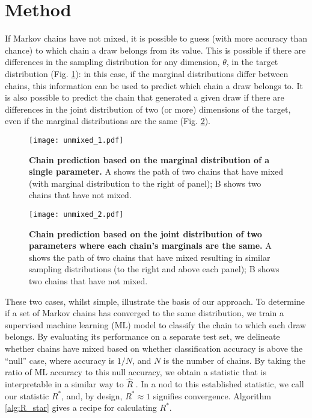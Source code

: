 \documentclass{article}
\begin{document}
\section{Method}\label{sec:method}
If Markov chains have not mixed, it is possible to guess (with more accuracy than chance) to which chain a draw belongs from its value. This is possible if there are differences in the sampling distribution for any dimension, $\theta$, in the target distribution (Fig. \ref{fig:marginal}): in this case, if the marginal distributions differ between chains, this information can be used to predict which chain a draw belongs to. It  is also possible to predict the chain that generated a given draw if there are differences in the joint distribution of two (or more) dimensions of the target, even if the marginal distributions are the same (Fig. \ref{fig:joint}).

\begin{figure}[!htb]
	\centerline{\texttt{[image: unmixed\_1.pdf]}}
	\caption{\textbf{Chain prediction based on the marginal distribution of a single parameter.} A shows the path of two chains that have mixed (with marginal distribution to the right of panel); B shows two chains that have not mixed.}
	\label{fig:marginal}
\end{figure}

\begin{figure}[h]
	\centerline{\texttt{[image: unmixed\_2.pdf]}}
	\caption{\textbf{Chain prediction based on the joint distribution of two parameters where each chain's marginals are the same.} A shows the path of two chains that have mixed resulting in similar sampling distributions (to the right and above each panel); B shows two chains that have not mixed.}
	\label{fig:joint}
\end{figure}

These two cases, whilst simple, illustrate the basis of our approach. To determine if a set of Markov chains has converged to the same distribution, we train a supervised machine learning (ML) model to classify the chain to which each draw belongs. By evaluating its performance on a separate test set, we delineate whether chains have mixed based on whether classification accuracy is above the ``null'' case, where accuracy is $1/{N}$, and $N$ is the number of chains. By taking the ratio of ML accuracy to this null accuracy, we obtain a statistic that is interpretable in a similar way to $\widehat{R}$ \citep{vehtari2019rank}. In a nod to this established statistic, we call our statistic $R^*$, and, by design, $R^*\approx 1$ signifies convergence. Algorithm \ref{alg:R_star} gives a recipe for calculating $R^*$.
\end{document}
